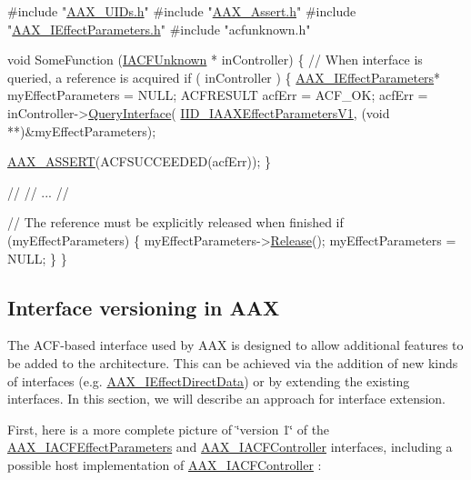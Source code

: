 \begin{DoxyCode}
\textcolor{preprocessor}{#include "\hyperlink{a00299}{AAX\_UIDs.h}"}
\textcolor{preprocessor}{#include "\hyperlink{a00158}{AAX\_Assert.h}"}
\textcolor{preprocessor}{#include "\hyperlink{a00247}{AAX\_IEffectParameters.h}"}
\textcolor{preprocessor}{#include "acfunknown.h"}

\textcolor{keywordtype}{void} SomeFunction (\hyperlink{a00146}{IACFUnknown} * inController)
\{
    \textcolor{comment}{// When interface is queried, a reference is acquired}
    \textcolor{keywordflow}{if} ( inController )
    \{
        \hyperlink{a00099}{AAX\_IEffectParameters}* myEffectParameters = NULL;
        ACFRESULT acfErr = ACF\_OK;
        acfErr = inController->\hyperlink{a00146_a8b7f0ae9c78d007ca76aa462ebe53135}{QueryInterface}(
            \hyperlink{a00299_a8379d320e9eabb19428d005fb6499f88}{IID\_IAAXEffectParametersV1},
            (\textcolor{keywordtype}{void} **)&myEffectParameters);
        
        \hyperlink{a00158_a168ee44fd7a5485ab50160db36fb2988}{AAX\_ASSERT}(ACFSUCCEEDED(acfErr));
    \}   
    
    \textcolor{comment}{//}
    \textcolor{comment}{// ...}
    \textcolor{comment}{//}
    
    \textcolor{comment}{// The reference must be explicitly released when finished}
    \textcolor{keywordflow}{if} (myEffectParameters)
    \{
        myEffectParameters->\hyperlink{a00146_afabd38cec0a9ed37f1d3e8644a70ac41}{Release}();
        myEffectParameters = NULL;
    \}
\}
\end{DoxyCode}
\hypertarget{a00357_ACF}{}\subsection{Interface versioning in A\+A\+X}\label{a00357_ACF}
The A\+C\+F-\/based interface used by A\+A\+X is designed to allow additional features to be added to the architecture. This can be achieved via the addition of new kinds of interfaces (e.\+g. \hyperlink{a00097}{A\+A\+X\+\_\+\+I\+Effect\+Direct\+Data}) or by extending the existing interfaces. In this section, we will describe an approach for interface extension.

First, here is a more complete picture of \char`\"{}version 1\char`\"{} of the \hyperlink{a00061}{A\+A\+X\+\_\+\+I\+A\+C\+F\+Effect\+Parameters} and \hyperlink{a00053}{A\+A\+X\+\_\+\+I\+A\+C\+F\+Controller} interfaces, including a possible host implementation of \hyperlink{a00053}{A\+A\+X\+\_\+\+I\+A\+C\+F\+Controller} \+:


